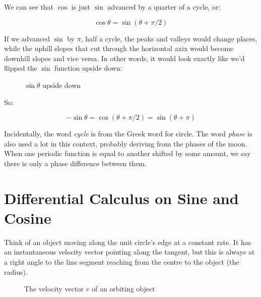 We can see that $\cos$ is just $\sin$ advanced by a quarter of a cycle, or:

$$
\cos \theta = \sin (\theta + \pi/2)
$$ 

If we advanced $\sin$ by $\pi$, half a cycle, the peaks and valleys would change places, while the uphill slopes that cut through the horizontal axix would become downhill slopes and vice versa. In other words, it would look exactly like we'd flipped the $\sin$ function upside down:

\begin{figure}[h]
    \centering
    \caption{$\sin \theta$ upside down} \label{fig:minus-sin}
\end{figure}

So:

$$
-\sin \theta = \cos (\theta + \pi/2) = \sin (\theta + \pi)
$$

Incidentally, the word \textit{cycle} is from the Greek word for circle. The word \textit{phase} is also used a lot in this context, probably deriving from the phases of the moon. When one periodic function is equal to another shifted by some amount, we say there is only a phase difference between them.

\section{Differential Calculus on Sine and Cosine}

Think of an object moving along the unit circle's edge at a constant rate. It has an instantaneous velocity vector pointing along the tangent, but this is always at a right angle to the line segment reaching from the centre to the object (the radius).

\begin{figure}[h]
    \centering
    \caption{The velocity vector $v$ of an orbiting object} \label{fig:circle-tangent}
\end{figure}


